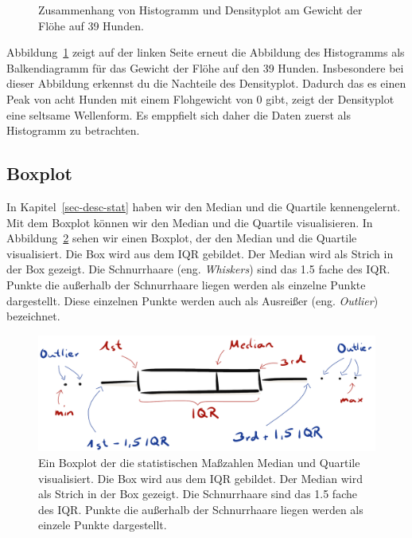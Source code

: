 \documentclass[
  letterpaper,
]{scrbook}
\begin{document}
\begin{figure}
\begin{minipage}[t]{0.50\linewidth}
{{}

}

\end{minipage}%

\caption{\label{fig-dens-flea-2}Zusammenhang von Histogramm und
Densityplot am Gewicht der Flöhe auf 39 Hunden.}

\end{figure}

Abbildung~\ref{fig-dens-flea-2} zeigt auf der linken Seite erneut die
Abbildung des Histogramms als Balkendiagramm für das Gewicht der Flöhe
auf den 39 Hunden. Insbesondere bei dieser Abbildung erkennst du die
Nachteile des Densityplot. Dadurch das es einen Peak von acht Hunden mit
einem Flohgewicht von 0 gibt, zeigt der Densityplot eine seltsame
Wellenform. Es emppfielt sich daher die Daten zuerst als Histogramm zu
betrachten.

\hypertarget{sec-eda-boxplot}{%
\subsection{Boxplot}\label{sec-eda-boxplot}}

In Kapitel~\ref{sec-desc-stat} haben wir den Median und die Quartile
kennengelernt. Mit dem Boxplot können wir den Median und die Quartile
visualisieren. In Abbildung~\ref{fig-boxplot-drawn} sehen wir einen
Boxplot, der den Median und die Quartile visualisiert. Die Box wird aus
dem IQR gebildet. Der Median wird als Strich in der Box gezeigt. Die
Schnurrhaare (eng. \emph{Whiskers}) sind das 1.5 fache des IQR. Punkte
die außerhalb der Schnurrhaare liegen werden als einzelne Punkte
dargestellt. Diese einzelnen Punkte werden auch als Ausreißer (eng.
\emph{Outlier}) bezeichnet.

\begin{figure}

{\centering \includegraphics[width=1\textwidth,height=\textheight]{./images/boxplot-drawn.png}

}

\caption{\label{fig-boxplot-drawn}Ein Boxplot der die statistischen
Maßzahlen Median und Quartile visualisiert. Die Box wird aus dem IQR
gebildet. Der Median wird als Strich in der Box gezeigt. Die
Schnurrhaare sind das 1.5 fache des IQR. Punkte die außerhalb der
Schnurrhaare liegen werden als einzele Punkte dargestellt.}

\end{figure}
\end{document}
